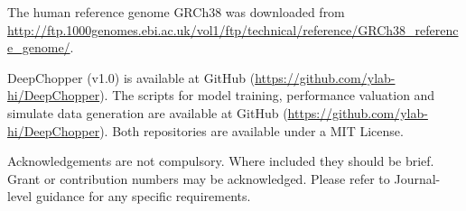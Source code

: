 \documentclass[pdflatex, sn-mathphys-num, lineno]{sn-jnl}%
\theoremstyle{thmstyleone}%
\theoremstyle{thmstyletwo}%
\theoremstyle{thmstylethree}%
\begin{document}



The human reference genome GRCh38 was downloaded from \url{http://ftp.1000genomes.ebi.ac.uk/vol1/ftp/technical/reference/GRCh38\_reference\_genome/}.



DeepChopper (v1.0) is available at GitHub (\url{https://github.com/ylab-hi/DeepChopper}).
The scripts for model training, performance valuation and simulate data generation are available at GitHub (\url{https://github.com/ylab-hi/DeepChopper}).
Both repositories are available under a MIT License.


Acknowledgements are not compulsory. Where included they should be brief. Grant or contribution numbers may be acknowledged.
Please refer to Journal-level guidance for any specific requirements.


\backmatter

\begin{appendices}
    \printglossary[type=\acronymtype, title=Abbreviations]

\end{appendices}
\end{document}
